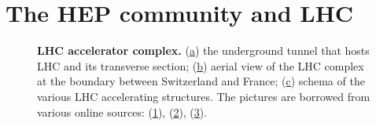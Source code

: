 \section{The HEP community and LHC}
\begin{figure}
    \centering
    
    \caption{\textbf{LHC accelerator complex.} (\hyperref[fig:lhc:pipes]{a}) the underground tunnel that hosts LHC and its transverse section;
    (\hyperref[fig:lhc:location]{b}) aerial view of the LHC complex at the boundary between Switzerland and France; (\hyperref[fig:lhc:schema]{c}) schema of the various LHC accelerating structures. The pictures are borrowed from various online sources: (\href{https://www.ansa.it/scienza/notizie/rubriche/fisica/2015/03/12/lacceleratore-lhc-pronto-a-ripartire-entro-2-settimane_60eed799-e47a-46e3-8908-056254a03a26.html?idPhoto=1}{1}), (\href{https://aec-analisiecalcolo.it/pubblicazioni/aec/86/656/}{2}), (\href{https://home.cern/science/accelerators/accelerator-complex}{3}).
    }
    \label{fig:lhc}
\end{figure}

